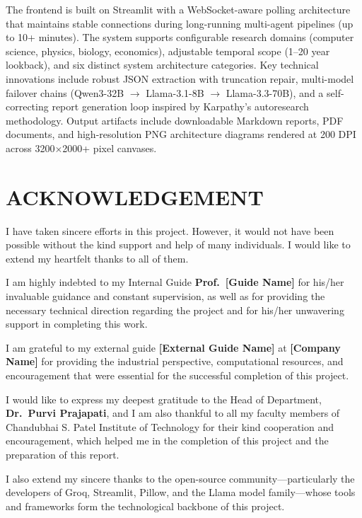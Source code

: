 \documentclass[a4paper,12pt,openany]{report}
\begin{document}
The frontend is built on Streamlit with a WebSocket-aware polling architecture that maintains stable connections during long-running multi-agent pipelines (up to 10+ minutes). The system supports configurable research domains (computer science, physics, biology, economics), adjustable temporal scope (1--20 year lookback), and six distinct system architecture categories. Key technical innovations include robust JSON extraction with truncation repair, multi-model failover chains (Qwen3-32B $\rightarrow$ Llama-3.1-8B $\rightarrow$ Llama-3.3-70B), and a self-correcting report generation loop inspired by Karpathy's autoresearch methodology. Output artifacts include downloadable Markdown reports, PDF documents, and high-resolution PNG architecture diagrams rendered at 200 DPI across 3200$\times$2000+ pixel canvases.


\chapter*{ACKNOWLEDGEMENT}
I have taken sincere efforts in this project. However, it would not have been possible without the kind support and help of many individuals. I would like to extend my heartfelt thanks to all of them.

I am highly indebted to my Internal Guide \textbf{Prof.\ [Guide Name]} for his/her invaluable guidance and constant supervision, as well as for providing the necessary technical direction regarding the project and for his/her unwavering support in completing this work.

I am grateful to my external guide \textbf{[External Guide Name]} at \textbf{[Company Name]} for providing the industrial perspective, computational resources, and encouragement that were essential for the successful completion of this project.

I would like to express my deepest gratitude to the Head of Department, \textbf{Dr.\ Purvi Prajapati}, and I am also thankful to all my faculty members of Chandubhai S. Patel Institute of Technology for their kind cooperation and encouragement, which helped me in the completion of this project and the preparation of this report.

I also extend my sincere thanks to the open-source community---particularly the developers of Groq, Streamlit, Pillow, and the Llama model family---whose tools and frameworks form the technological backbone of this project.
\end{document}
